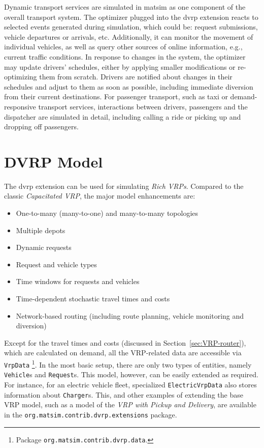 Dynamic transport services are simulated in \gls{matsim} as one component of the overall transport system. The optimizer plugged into the \gls{dvrp} extension reacts to selected events generated during simulation, which could be: request submissions, vehicle departures or arrivals, etc. Additionally, it can monitor the movement of individual vehicles, as well as query other sources of online information, e.g.,\,current traffic conditions. In response to changes in the system, the optimizer may update drivers' schedules, either by applying smaller modifications or re-optimizing them from scratch. Drivers are notified about changes in their schedules and adjust to them as soon as possible, including immediate diversion from their current destinations. For passenger transport, such as taxi or demand-responsive transport services, interactions between drivers, passengers and the dispatcher are simulated in detail, including calling a ride or picking up and dropping off passengers.

\section{DVRP Model}
\label{sec:DVRP_model}
The \gls{dvrp} extension can be used for simulating \emph{Rich VRPs}. Compared to the classic \emph{Capacitated VRP}, the major model enhancements are:
%
\begin{itemize}
	\item One-to-many (many-to-one) and many-to-many topologies
	\item Multiple depots
	\item Dynamic requests
	\item Request and vehicle types
	\item Time windows for requests and vehicles
	\item Time-dependent stochastic travel times and costs
	\item Network-based routing (including route planning, vehicle monitoring and diversion)
\end{itemize}
%
Except for the travel times and costs (discussed in Section~\ref{sec:VRP-router}), which are calculated on demand, all the VRP-related data are accessible via \lstinline$VrpData$%
\footnote{
Package \lstinline$org.matsim.contrib.dvrp.data$.
}.
In the most basic setup, there are only two types of entities, namely \lstinline$Vehicle$s and \lstinline$Request$s. This model, however, can be easily extended as required. For instance, for an electric vehicle fleet, specialized \lstinline$ElectricVrpData$ also stores information about \lstinline$Charger$s. This, and other examples of extending the base VRP model, such as a model of the \emph{VRP with Pickup and Delivery}, are available in the \lstinline$org.matsim.contrib.dvrp.extensions$ package.

